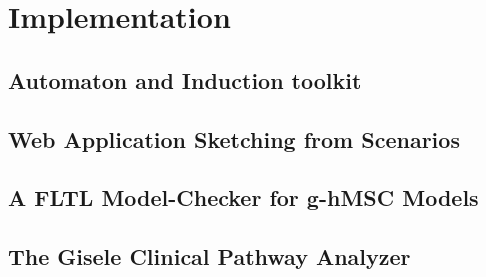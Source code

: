 \chapter{Implementation}

\section{Automaton and Induction toolkit}

\section{Web Application Sketching from Scenarios}

\section{A FLTL Model-Checker for g-hMSC Models}

\section{The Gisele Clinical Pathway Analyzer}
